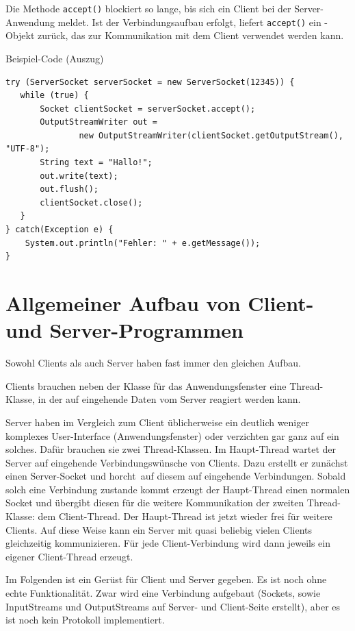 Die Methode \lstinline|accept()| blockiert so lange, bis sich ein Client bei der
Server-Anwendung meldet. Ist der Verbindungsaufbau erfolgt, liefert
\lstinline|accept()| ein -Objekt zurück, das zur
Kommunikation mit dem Client verwendet werden kann.

Beispiel-Code (Auszug)

\begin{lstlisting}
try (ServerSocket serverSocket = new ServerSocket(12345)) {
   while (true) {
       Socket clientSocket = serverSocket.accept();
       OutputStreamWriter out = 
               new OutputStreamWriter(clientSocket.getOutputStream(), "UTF-8");
       String text = "Hallo!";
       out.write(text);
       out.flush();
       clientSocket.close();
   }
} catch(Exception e) {
    System.out.println("Fehler: " + e.getMessage());
}
\end{lstlisting}


\section{Allgemeiner Aufbau von Client- und Server-Programmen}

Sowohl Clients als auch Server haben fast immer den gleichen Aufbau. 

\begin{compactitem}
\item Clients brauchen neben der Klasse für das Anwendungsfenster eine
Thread-Klasse, in der auf eingehende Daten vom Server reagiert werden kann.

\item Server haben im Vergleich zum Client üblicherweise ein deutlich weniger
komplexes User-Interface (Anwendungsfenster) oder verzichten gar ganz auf ein
solches. Dafür brauchen sie zwei Thread-Klassen. Im Haupt-Thread wartet der
Server auf eingehende Verbindungswünsche von Clients. Dazu erstellt er zunächst
einen Server-Socket und \glqq horcht\grqq\ auf diesem auf eingehende
Verbindungen. Sobald solch eine Verbindung zustande kommt erzeugt der
Haupt-Thread einen normalen Socket und übergibt diesen für die weitere
Kommunikation der zweiten Thread-Klasse: dem Client-Thread. Der Haupt-Thread
ist jetzt wieder frei für weitere Clients. Auf diese Weise kann ein Server mit
quasi beliebig vielen Clients gleichzeitig kommunizieren. Für jede
Client-Verbindung wird dann jeweils ein eigener Client-Thread erzeugt.
\end{compactitem}

Im Folgenden ist ein Gerüst für Client und Server gegeben. Es ist noch ohne
echte Funktionalität. Zwar wird eine Verbindung aufgebaut (Sockets, sowie
InputStreams und OutputStreams auf Server- und Client-Seite erstellt), aber es
ist noch kein Protokoll implementiert.

